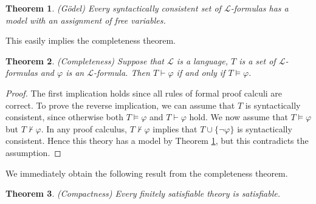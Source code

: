 \documentclass[10pt]{amsart}
\renewcommand{\L}{\mathcal{L}}
\newtheorem{theorem}{Theorem}[subsection]
\theoremstyle{definition}
\theoremstyle{remark}
\begin{document}
\begin{theorem} (G\"odel) \label{syntactically consistent theories have models} 
Every syntactically consistent set of $\L$-formulas has a model with an assignment of free variables. 
\end{theorem} 

This easily implies the completeness theorem. 

\begin{theorem} (Completeness) 
Suppose that $\L$ is a language, $T$ is a set of $\L$-formulas and $\varphi$ is an $\L$-formula. Then $T\vdash \varphi$ if and only if $T\models \varphi$. 
\end{theorem} 
\begin{proof} 
The first implication holds since all rules of formal proof calculi are correct. To prove the reverse implication, we can assume that $T$ is syntactically consistent, since otherwise both $T\models \varphi$ and $T\vdash\varphi$ hold. We now assume that $T\models \varphi$ but $T\not\vdash \varphi$. In any proof calculus, $T\not\vdash \varphi$ implies that $T\cup\{\neg\varphi\}$ is syntactically consistent. 
Hence this theory has a model by Theorem \ref{syntactically consistent theories have models}, but this contradicts the assumption. 
\end{proof} 

We immediately obtain the following result from the completeness theorem. 

\begin{theorem} (Compactness) \label{compactness theorem} 
Every finitely satisfiable theory is satisfiable. 
\end{theorem} 
\end{document}
